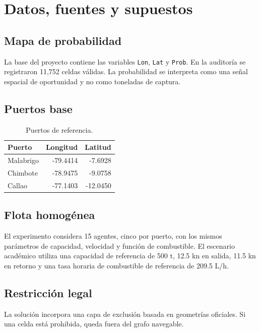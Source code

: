\section{Datos, fuentes y supuestos}
\subsection{Mapa de probabilidad}
La base del proyecto contiene las variables \texttt{Lon}, \texttt{Lat} y \texttt{Prob}. En la auditoría se registraron 11,752 celdas válidas. La probabilidad se interpreta como una señal espacial de oportunidad y no como toneladas de captura.
\subsection{Puertos base}
\begin{table}[H]
\centering
\caption{Puertos de referencia.}
\begin{tabular}{lrr}
\toprule
Puerto & Longitud & Latitud \\
\midrule
Malabrigo & -79.4414 & -7.6928 \\
Chimbote & -78.9475 & -9.0758 \\
Callao & -77.1403 & -12.0450 \\
\bottomrule
\end{tabular}
\end{table}
\subsection{Flota homogénea}
El experimento considera 15 agentes, cinco por puerto, con los mismos parámetros de capacidad, velocidad y función de combustible. El escenario académico utiliza una capacidad de referencia de 500 t, 12.5 kn en salida, 11.5 kn en retorno y una tasa horaria de combustible de referencia de 209.5 L/h.
\subsection{Restricción legal}
La solución incorpora una capa de exclusión basada en geometrías oficiales. Si una celda está prohibida, queda fuera del grafo navegable.
